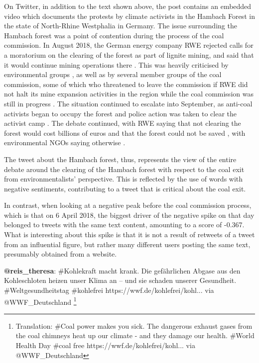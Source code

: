 \documentclass[12pt,onecolumn,twoside]{layout}
\begin{document}
On Twitter, in addition to the text shown above, the post contains an embedded video which documents the protests by climate activists in the Hambach Forest in the state of North-Rhine Westphalia in Germany. The issue surrounding the Hambach forest was a point of contention during the process of the coal commission. In August 2018, the German energy company RWE rejected calls for a moratorium on the clearing of the forest as part of lignite mining, and said that it would continue mining operations there \cite{Knuf2018}. This was heavily criticised by environmental groups \cite{Schafer2018}, as well as by several member groups of the coal commission, some of which who threatened to leave the commission if RWE did not halt its mine expansion activities in the region while the coal commission was still in progress \cite{Wehrmann2018a}. The situation continued to escalate into September, as anti-coal activists began to occupy the forest and police action was taken to clear the activist camp \cite{CEW2018}. The debate continued, with RWE saying that not clearing the forest would cost billions of euros and that the forest could not be saved \cite{CEW2018a}, with environmental NGOs saying otherwise \cite{Kopiske2018}.

The tweet about the Hambach forest, thus, represents the view of the entire debate around the clearing of the Hambach forest with respect to the coal exit from environmentalists' perspective. This is reflected by the use of words with negative sentiments, contributing to a tweet that is critical about the coal exit. 

In contrast, when looking at a negative peak before the coal commission process, which is that on 6 April 2018, the biggest driver of the negative spike on that day belonged to tweets with the same text content, amounting to a score of -0.367. What is interesting about this spike is that it is not a result of retweets of a tweet from an influential figure, but rather many different users posting the same text, presumably obtained from a website. 

\begin{displayquote}
	\textbf{@reis\_theresa}: \#Kohlekraft macht krank. Die gefährlichen Abgase aus den Kohleschloten heizen unser Klima an – und sie schaden unserer Gesundheit. \#Weltgesundheitstag \#kohlefrei https://wwf.de/kohlefrei/kohl... via @WWF\_Deutschland
	\footnote{Translation: \#Coal power makes you sick. The dangerous exhaust gases from the coal chimneys heat up our climate - and they damage our health. \#World Health Day \#coal free https://wwf.de/kohlefrei/kohl... via @WWF\_Deutschland}
\end{displayquote}
\end{document}
